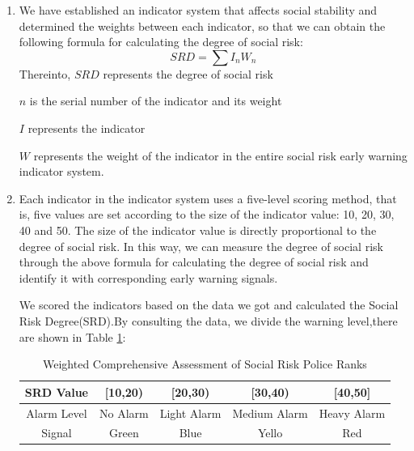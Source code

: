 \documentclass[12pt]{article}  %
\begin{document}
\begin{enumerate}
	\renewcommand{\labelenumi}{\textbf{Step \theenumi}}
\item We have established an indicator system that affects social stability and determined the weights between each indicator, so that we can obtain the following formula for calculating the degree of social risk:
\begin{equation}
	SRD=\sum I_nW_n
\end{equation}
Thereinto, $SRD$ represents the degree of social risk

\hspace{4.5em}$n$ is the serial number of the indicator and its weight

\hspace{4.5em}$I$ represents the indicator

\hspace{4.5em}$W$ represents the weight of the indicator in the entire social risk early warning indicator system.
\item Each indicator in the indicator system uses a five-level scoring method, that is, five values are set according to the size of the indicator value: 10, 20, 30, 40 and 50. The size of the indicator value is directly proportional to the degree of social risk. In this way, we can measure the degree of social risk through the above formula for calculating the degree of social risk and identify it with corresponding early warning signals.

We scored the indicators based on the data we got and calculated the Social Risk Degree(SRD).By consulting the data, we divide the warning level,there are shown in Table \ref{srd}:
\begin{table}[!ht]  
    \centering
    \caption{Weighted Comprehensive Assessment of Social Risk Police Ranks}
    \label{srd}
    \begin{tabular}{ccccc}
    \hline
        SRD Value & [10,20) & [20,30) & [30,40) & [40,50] \\ \hline
        Alarm Level & No Alarm & Light Alarm & Medium Alarm & Heavy Alarm \\ 
        Signal & Green & Blue & Yello & Red \\ \hline
    \end{tabular} 
\end{table}








\end{enumerate}
\end{document}
